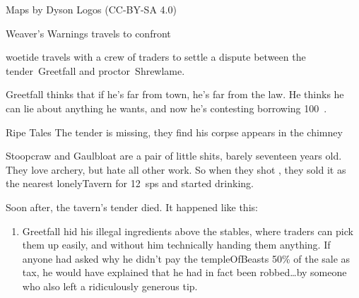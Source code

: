 \documentclass[10pt,twoside]{book}
\begin{document}

Maps by Dyson Logos (CC-BY-SA 4.0)




{Weaver's Warnings}%
{ travels to confront }%

\pagestyle{minizine}%

\Gls{woetide} travels with a crew of traders
to settle a dispute between the \gls{tender}~Greetfall and \gls{proctor}~Shrewlame.

\begin{speechtext}
  Greetfall thinks that if he's far from town, he's far from the law.
  He thinks he can lie about anything he wants, and now he's contesting borrowing 100~.
\end{speechtext}

{Ripe Tales}%
{The \gls{tender} is missing, they find his corpse appears in the chimney}%

Stoopcraw and Gaulbloat are a pair of little shits, barely seventeen years old.
They love archery, but hate all other work.
So when they shot , they sold it as the nearest \gls{lonelyTavern} for 12~\glspl{sp} and started drinking.

Soon after, the tavern's \gls{tender} died.
It happened like this:


\begin{enumerate}\itemsep0em
  \item
  Greetfall hid his illegal \glspl{ingredient} above the stables, where traders can pick them up easily, and without him technically handing them anything.
  \label{lt:ingStore}
  If anyone had asked why he didn't pay the \gls{templeOfBeasts} 50\% of the sale as tax, he would have explained that he had in fact been robbed\ldots by someone who also left a ridiculously generous tip.
\end{enumerate}
\end{document}
